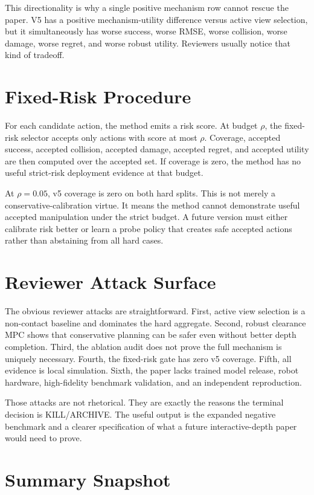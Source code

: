 \documentclass{article}
\begin{document}
This directionality is why a single positive mechanism row cannot rescue the paper. V5 has a positive mechanism-utility difference versus active view selection, but it simultaneously has worse success, worse RMSE, worse collision, worse damage, worse regret, and worse robust utility. Reviewers usually notice that kind of tradeoff.

\section{Fixed-Risk Procedure}
For each candidate action, the method emits a risk score. At budget $\rho$, the fixed-risk selector accepts only actions with score at most $\rho$. Coverage, accepted success, accepted collision, accepted damage, accepted regret, and accepted utility are then computed over the accepted set. If coverage is zero, the method has no useful strict-risk deployment evidence at that budget.

At $\rho=0.05$, v5 coverage is zero on both hard splits. This is not merely a conservative-calibration virtue. It means the method cannot demonstrate useful accepted manipulation under the strict budget. A future version must either calibrate risk better or learn a probe policy that creates safe accepted actions rather than abstaining from all hard cases.

\section{Reviewer Attack Surface}
The obvious reviewer attacks are straightforward. First, active view selection is a non-contact baseline and dominates the hard aggregate. Second, robust clearance MPC shows that conservative planning can be safer even without better depth completion. Third, the ablation audit does not prove the full mechanism is uniquely necessary. Fourth, the fixed-risk gate has zero v5 coverage. Fifth, all evidence is local simulation. Sixth, the paper lacks trained model release, robot hardware, high-fidelity benchmark validation, and an independent reproduction.

Those attacks are not rhetorical. They are exactly the reasons the terminal decision is KILL/ARCHIVE. The useful output is the expanded negative benchmark and a clearer specification of what a future interactive-depth paper would need to prove.

\section{Summary Snapshot}
\end{document}
